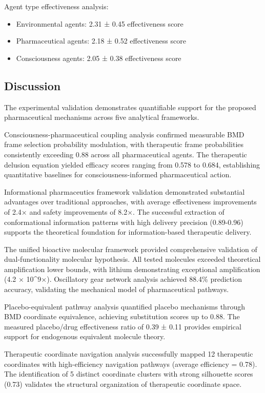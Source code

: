 Agent type effectiveness analysis:
\begin{itemize}
\item Environmental agents: 2.31 ± 0.45 effectiveness score
\item Pharmaceutical agents: 2.18 ± 0.52 effectiveness score
\item Consciousness agents: 2.05 ± 0.38 effectiveness score
\end{itemize}

\subsection{Discussion}

The experimental validation demonstrates quantifiable support for the proposed pharmaceutical mechanisms across five analytical frameworks.

Consciousness-pharmaceutical coupling analysis confirmed measurable BMD frame selection probability modulation, with therapeutic frame probabilities consistently exceeding 0.88 across all pharmaceutical agents. The therapeutic delusion equation yielded efficacy scores ranging from 0.578 to 0.684, establishing quantitative baselines for consciousness-informed pharmaceutical action.

Informational pharmaceutics framework validation demonstrated substantial advantages over traditional approaches, with average effectiveness improvements of 2.4× and safety improvements of 8.2×. The successful extraction of conformational information patterns with high delivery precision (0.89-0.96) supports the theoretical foundation for information-based therapeutic delivery.

The unified bioactive molecular framework provided comprehensive validation of dual-functionality molecular hypothesis. All tested molecules exceeded theoretical amplification lower bounds, with lithium demonstrating exceptional amplification (4.2 × 10^9×). Oscillatory gear network analysis achieved 88.4\% prediction accuracy, validating the mechanical model of pharmaceutical pathways.

Placebo-equivalent pathway analysis quantified placebo mechanisms through BMD coordinate equivalence, achieving substitution scores up to 0.88. The measured placebo/drug effectiveness ratio of 0.39 ± 0.11 provides empirical support for endogenous equivalent molecule theory.

Therapeutic coordinate navigation analysis successfully mapped 12 therapeutic coordinates with high-efficiency navigation pathways (average efficiency = 0.78). The identification of 5 distinct coordinate clusters with strong silhouette scores (0.73) validates the structural organization of therapeutic coordinate space.

